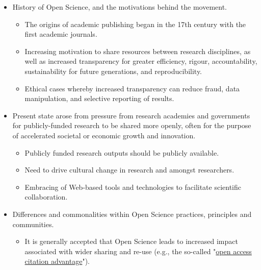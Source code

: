 \documentclass{article}
\begin{document}
\begin{itemize}
\item History of Open Science, and the motivations behind the movement.

\begin{itemize}
\item The origins of academic publishing began in the 17th century with the first academic journals.


\item Increasing motivation to share resources between research disciplines, as well as increased transparency for greater efficiency, rigour, accountability, sustainability for future generations, and reproducibility.


\item Ethical cases whereby increased transparency can reduce fraud, data manipulation, and selective reporting of results.


\end{itemize}

\item Present state arose from pressure from research academies and governments for publicly-funded research to be shared more openly, often for the purpose of accelerated societal or economic growth and innovation.

\begin{itemize}
\item Publicly funded research outputs should be publicly available.


\item Need to drive cultural change in research and amongst researchers.


\item Embracing of Web-based tools and technologies to facilitate scientific collaboration.


\end{itemize}

\item Differences and commonalities within Open Science practices, principles and communities.

\begin{itemize}
\item It is generally accepted that Open Science leads to increased impact associated with wider sharing and re-use (e.g., the so-called "\href{https://sparceurope.org/what-we-do/open-access/sparc-europe-open-access-resources/open-access-citation-advantage-service-oaca/oaca-list/}{open access citation advantage}").



\end{itemize}
\end{itemize}
\end{document}
